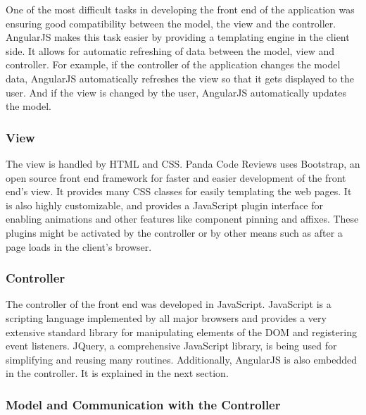 One of the most difficult tasks in developing the front end of the application
was ensuring good compatibility between the model, the view and the controller.
AngularJS makes this task easier by providing a templating engine in the client
side. It allows for automatic refreshing of data between the model, view and
controller. For example, if the controller of the application changes the model
data, AngularJS automatically refreshes the view so that it gets displayed to
the user. And if the view is changed by the user, AngularJS automatically
updates the model.

\subsubsection{View}

The view is handled by HTML and CSS. Panda Code Reviews uses
Bootstrap\cite{bootstrap}, an open source front end framework for faster and
easier development of the front end's view. It provides many CSS classes for
easily templating the web pages. It is also highly customizable, and provides a
JavaScript plugin interface for enabling animations and other features like
component pinning and affixes. These plugins might be activated by the
controller or by other means such as after a page loads in the client's browser.

\subsubsection{Controller}

The controller of the front end was developed in JavaScript. JavaScript is
a scripting language implemented by all major browsers and provides a very
extensive standard library for manipulating elements of the DOM and registering
event listeners. JQuery\cite{jquery}, a comprehensive JavaScript library, is
being used for simplifying and reusing many routines. Additionally, AngularJS is
also embedded in the controller. It is explained in the next section.

\subsubsection{Model and Communication with the Controller}

